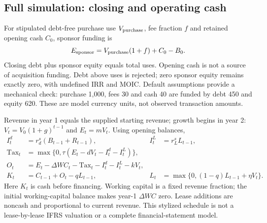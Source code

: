 \documentclass[11pt,a4paper]{article}
\theoremstyle{plain}
\theoremstyle{definition}
\begin{document}
\subsection{Full simulation: closing and operating cash}
For stipulated debt-free purchase use $V_{\rm purchase}$, fee fraction $f$ and
retained opening cash $C_0$, sponsor funding is
\begin{equation}
E_{\rm sponsor}=V_{\rm purchase}(1+f)+C_0-B_0.\label{eq:closing}
\end{equation}
Closing debt plus sponsor equity equals total uses. Opening cash is not a source
of acquisition funding. Debt above uses is rejected; zero sponsor equity remains
exactly zero, with undefined IRR and MOIC. Default assumptions provide a mechanical
check: purchase 1,000, fees 30 and cash 40 are funded by debt 450 and equity 620.
These are model currency units, not observed transaction amounts.

Revenue in year 1 equals the supplied starting revenue; growth begins in year 2:
$V_t=V_0(1+g)^{t-1}$ and $E_t=mV_t$. Using opening balances,
\begin{align}
I_t^d&=r_d^{s}(B_{t-1}+R_{t-1}),& I_t^L&=r_L^{s}L_{t-1},\\
\mathrm{Tax}_t&=\max\{0,\tau(E_t-dV_t-I_t^d-I_t^L)\},\\
O_t&=E_t-\Delta WC_t-\mathrm{Tax}_t-I_t^d-I_t^L-kV_t,\\
K_t&=C_{t-1}+O_t-qL_{t-1},&
L_t&=\max\{0,(1-q)L_{t-1}+\eta V_t\}.
\end{align}
Here $K_t$ is cash before financing. Working capital is a fixed revenue fraction;
the initial working-capital balance makes year-1 $\Delta WC$ zero. Lease additions
are noncash and proportional to current revenue. This stylized schedule is not a
lease-by-lease IFRS valuation or a complete financial-statement model.
\end{document}

